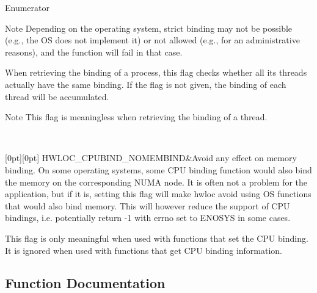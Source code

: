 \begin{DoxyEnumFields}{Enumerator}
\begin{DoxyNote}{Note}
Depending on the operating system, strict binding may not be possible (e.\+g., the OS does not implement it) or not allowed (e.\+g., for an administrative reasons), and the function will fail in that case.
\end{DoxyNote}
When retrieving the binding of a process, this flag checks whether all its threads actually have the same binding. If the flag is not given, the binding of each thread will be accumulated.

\begin{DoxyNote}{Note}
This flag is meaningless when retrieving the binding of a thread. 
\end{DoxyNote}
\\
\hline

[0pt][0pt]{}\mbox{\label{a00190_gga217dc8d373f8958cc93c154ebce1c71ca41ce440443cc3087caed95ab60edcad6}} 
H\+W\+L\+O\+C\+\_\+\+C\+P\+U\+B\+I\+N\+D\+\_\+\+N\+O\+M\+E\+M\+B\+I\+ND&Avoid any effect on memory binding. On some operating systems, some C\+PU binding function would also bind the memory on the corresponding N\+U\+MA node. It is often not a problem for the application, but if it is, setting this flag will make hwloc avoid using OS functions that would also bind memory. This will however reduce the support of C\+PU bindings, i.\+e. potentially return -\/1 with errno set to E\+N\+O\+S\+YS in some cases.

This flag is only meaningful when used with functions that set the C\+PU binding. It is ignored when used with functions that get C\+PU binding information. \\
\hline

\end{DoxyEnumFields}


\subsection{Function Documentation}
\mbox{\label{a00190_gacba7ecb979baf824d5240fa2cb2a8be6}} 
